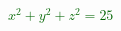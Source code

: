 \documentclass[10pt]{article}                               %
\begin{document}
\begin{defaultbox}
\begin{adjustwidth}{2em}{0pt}
\begin{adjustwidth}{2em}{0pt}
\begin{examplebox}
\begin{adjustwidth}{2em}{0pt}
                        \textcolor{darkgreen}{\( x^2 + y^2 + z^2 = 25 \)}
                
                    \end{adjustwidth}
                
                \end{examplebox}

        \end{adjustwidth}

    \end{adjustwidth}

\end{defaultbox}
\end{document}
